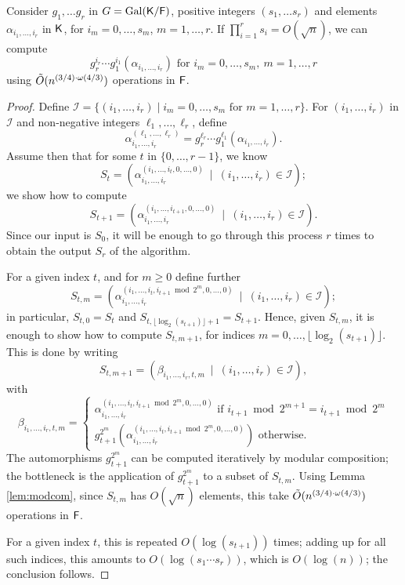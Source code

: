 \begin{lemma}\label{lem:selfcomp}
  Consider $g_1, \ldots g_r$ in $G=\mathrm{Gal}({\mathsf{K}}/{\mathsf{F}})$, positive
  integers $(s_1, \ldots s_r)$ and elements $\alpha_{i_1, \dots, i_r}$
  in ${\mathsf{K}}$, for $i_m=0,\dots,s_m$, $m=1,\dots,r$. If $\prod_{i = 1}^r s_i
  = O(\sqrt{n})$, we can compute
  $$g_r^{i_r}\cdots g_1^{i_1}(\alpha_{i_1, \dots, i_r})
  \text{~for~} i_m=0,\dots,s_m,\ m=1,\dots,r
  $$  using $\tilde{O}(n^{(3/4)\cdot \omega(4/3)})$ operations in ${\mathsf{F}}$.
\end{lemma}
\begin{proof}
  Define $\mathcal I = \{(i_1,\dots,i_r) \mid i_m=0,\dots,s_m
  \text{~for~} m=1,\dots,r\}$. For $(i_1,\dots,i_r)$ in $\mathcal I$
  and non-negative integers $\ell_1,\dots,\ell_r$, define
  $$\alpha_{i_1, \dots, i_r}^{(\ell_1,\dots,\ell_r)} 
  =g_r^{\ell_r} \cdots g_1^{\ell_1}(\alpha_{i_1, \dots, i_r}).$$  
  Assume then that
  for some $t$ in $\{0,\dots,r-1\}$, we know 
  $$S_t=(\alpha_{i_1, \dots,i_r}^{(i_1, \dots, i_{t},0, \dots, 0)} \ \mid \ (i_1,\dots,i_r)\in \mathcal I);$$ we show how to compute 
  $$S_{t+1}=(\alpha_{i_1, \dots,i_r}^{(i_1, \dots, i_{t+1},0, \dots, 0)}
  \ \mid \ (i_1,\dots,i_r)\in \mathcal I).$$ Since our input is $S_0$,
  it will be enough to go through this process $r$ times to obtain the
  output $S_r$ of the algorithm.
  
  For a given index $t$, and for $m \ge 0$
  define further 
  $$S_{t,m}=(\alpha_{i_1, \dots,i_r}^{(i_1, \dots, i_{t},i_{t+1} \bmod 2^m, 0,\dots, 0)} \ \mid \ (i_1,\dots,i_r)\in \mathcal I);$$
  in particular, $S_{t,0} = S_t$ and $S_{t,\lfloor \log_2(s_{t+1})\rfloor+1} = S_{t+1}$. 
  Hence, given $S_{t,m}$, it is enough to show how to compute $S_{t,m+1}$,
  for indices $m=0,\dots,\lfloor \log_2(s_{t+1})\rfloor$.
  This is done by writing 
  $$S_{t,m+1}=
  (\beta_{i_1, \dots,i_r,t,m} \ \mid \ (i_1,\dots,i_r)\in \mathcal I),$$
  with
  $$\beta_{i_1, \dots,i_r,t,m}
  =\begin{cases}
  \alpha_{i_1, \dots,i_r}^{(i_1, \dots, i_{t},i_{t+1} \bmod 2^m,0, \dots, 0)}  \text{~if~} 
  i_{t+1} \bmod 2^{m+1} = i_{t+1} \bmod 2^m \\[2mm]
  g_{t+1}^{2^{m}}(\alpha_{i_1, \dots,i_r}^{(i_1, \dots, i_{t},i_{t+1} \bmod 2^m,0, \dots, 0)}) 
  \text{~otherwise.}
  \end{cases}$$
  The automorphisms $g_{t+1}^{2^m}$ can be computed iteratively by modular
  composition; the bottleneck is the application of  $g_{t+1}^{2^m}$
  to a subset of $S_{t,m}$. Using Lemma \ref{lem:modcom}, since 
  $S_{t,m}$ has $O(\sqrt n)$ elements, this take $\tilde{O}(n^{(3/4)\cdot \omega(4/3)})$ 
  operations in ${\mathsf{F}}$.
  
  For a given index $t$, this is repeated $O(\log(s_{t+1}))$ times;
  adding up for all such indices, this amounts to $O(\log (s_1 \cdots s_r))$,
  which is $O(\log(n))$; the conclusion follows.
\end{proof}


